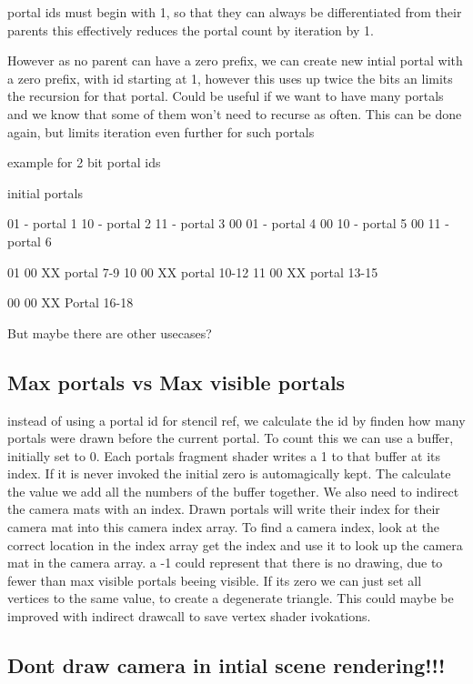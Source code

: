 portal ids must begin with 1, so that they can always be differentiated from their parents
this effectively reduces the portal count by iteration by 1.

However as no parent can have a zero prefix, we can create new intial portal with a zero prefix, with id starting at 1, however this uses up twice the bits an limits the recursion for that portal. Could be useful if we want to have many portals and we know that some of them won't need to recurse as often.
This can be done again, but limits iteration even further for such portals

example for 2 bit portal ids

initial portals

01 - portal 1
10 - portal 2
11 - portal 3
00 01 - portal 4
00 10 - portal 5
00 11 - portal 6

01 00 XX portal 7-9
10 00 XX portal 10-12
11 00 XX portal 13-15

00 00 XX Portal 16-18

But  maybe there are other usecases?




\subsection{Max portals vs Max visible portals}
instead of using a portal id for stencil ref, we calculate the id by finden how many portals were drawn before the current portal.
To count this we can use a buffer, initially set to 0. Each portals fragment shader writes a 1 to that buffer at its index. If it is never invoked the initial zero is automagically kept. The calculate the value we add all the numbers of the buffer together.
We also need to indirect the camera mats with an index. Drawn portals will write their index for their camera mat into this camera index array.
To find a camera index, look at the correct location in the index array get the index and use it to look up the camera mat in the camera array. a -1 could represent that there is no drawing, due to fewer than max visible portals beeing visible. If its zero we can just set all vertices to the same value, to create a degenerate triangle.
This could maybe be improved with indirect drawcall to save vertex shader ivokations.

\subsection{Dont draw camera in intial scene rendering!!!}

